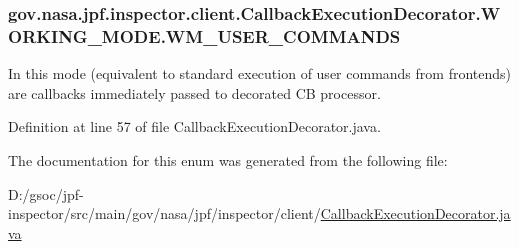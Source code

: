 \subsubsection[{\texorpdfstring{W\+M\+\_\+\+U\+S\+E\+R\+\_\+\+C\+O\+M\+M\+A\+N\+DS}{WM_USER_COMMANDS}}]{\setlength{\rightskip}{0pt plus 5cm}gov.\+nasa.\+jpf.\+inspector.\+client.\+Callback\+Execution\+Decorator.\+W\+O\+R\+K\+I\+N\+G\+\_\+\+M\+O\+D\+E.\+W\+M\+\_\+\+U\+S\+E\+R\+\_\+\+C\+O\+M\+M\+A\+N\+DS}\hypertarget{enumgov_1_1nasa_1_1jpf_1_1inspector_1_1client_1_1_callback_execution_decorator_1_1_w_o_r_k_i_n_g___m_o_d_e_ad92512bd45abad7bde4fdcb5e1daac49}{}\label{enumgov_1_1nasa_1_1jpf_1_1inspector_1_1client_1_1_callback_execution_decorator_1_1_w_o_r_k_i_n_g___m_o_d_e_ad92512bd45abad7bde4fdcb5e1daac49}


In this mode (equivalent to standard execution of user commands from frontends) are callbacks immediately passed to decorated CB processor. 



Definition at line 57 of file Callback\+Execution\+Decorator.\+java.



The documentation for this enum was generated from the following file\+:\begin{DoxyCompactItemize}
\item 
D\+:/gsoc/jpf-\/inspector/src/main/gov/nasa/jpf/inspector/client/\hyperlink{_callback_execution_decorator_8java}{Callback\+Execution\+Decorator.\+java}\end{DoxyCompactItemize}
